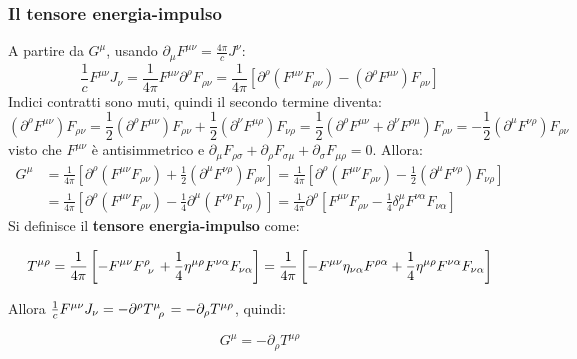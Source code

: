\documentclass[10pt, a4paper]{scrartcl}
\numberwithin{equation}{subsection}
\theoremstyle{style1}
\newenvironment{boxenv}[1][]{
    \begin{eqbox}[#1]
    }{
   \end{eqbox}
}
\begin{document}
\subsubsection{Il tensore energia-impulso}
A partire da $G^\mu $, usando $\partial _\mu F^{\mu \nu } =\frac{4\pi}{c}J^\nu $:
\[
\frac{1}{c}F^{\mu \nu } J_\nu = \frac{1}{4\pi} F^{\mu \nu } \partial ^\rho F_{\rho \nu } = \frac{1}{4\pi} \left[ \partial ^\rho (F^{\mu \nu } F_{\rho \nu }) - (\partial ^\rho F^{\mu \nu }) F_{\rho \nu }    \right] 
\] 
Indici contratti sono muti, quindi il secondo termine diventa:
\[
	(\partial ^\rho F^{\mu \nu } ) F_{\rho \nu } = \frac{1}{2}(\partial ^\rho F^{\mu \nu } ) F_{\rho  \nu } + \frac{1}{2}(\partial ^\nu F^{\mu \rho } ) F_{\nu \rho } = \frac{1}{2}(\partial ^\rho  F^{\mu \nu } + \partial ^\nu F^{\rho \mu } )F_{\rho \nu } =-\frac{1}{2} (\partial ^\mu F^{\nu \rho } )F_{\rho \nu } 
\] 
visto che $F^{\mu \nu } $ \`e antisimmetrico e $\partial _\mu  F_{\rho \sigma } + \partial _\rho F_{\sigma \mu } + \partial _\sigma F_{\mu \rho } =0$. Allora:
\begin{equation}
	\begin{split}
		G^{\mu }& = \frac{1}{4\pi} \left[ \partial ^\rho (F^{\mu \nu } F_{\rho \nu }) +\frac{1}{2} (\partial ^\mu F^{\nu \rho } ) F_{\rho \nu }  \right] = \frac{1}{4\pi} \left[ \partial ^\rho (F^{\mu \nu } F_{\rho \nu } ) - \frac{1}{2} (\partial ^\mu F^{\nu \rho } ) F_{\nu \rho }   \right] \\
			&= \frac{1}{4\pi }\left[ \partial ^\rho (F^{\mu \nu } F_{\rho \nu } ) - \frac{1}{4} \partial ^\mu (F^{\nu \rho } F_{\nu \rho } )  \right] = \frac{1}{4\pi} \partial ^\rho \left[ F^{\mu \nu } F_{\rho \nu } -\frac{1}{4} \delta ^{\mu } _\rho F^{\nu \alpha } F_{\nu \alpha }  \right] 
	\end{split}
\end{equation}
Si definisce il \textbf{tensore energia-impulso} come:
\begin{boxenv}[]
\begin{equation}
	T^{\mu \rho } = \frac{1}{4\pi} \left[ - F^{\mu \nu } F\indices{^\rho _\nu} + \frac{1}{4} \eta^{\mu \rho } F^{\nu \alpha } F_{\nu \alpha }  \right] = \frac{1}{4\pi}\left[ -F^{\mu \nu } \eta_{\nu \alpha } F^{\rho \alpha } +\frac{1}{4}\eta^{\mu \rho } F^{\nu \alpha } F_{\nu \alpha }     \right] 
\end{equation}
\end{boxenv}
\noindent Allora $\frac{1}{c}F^{\mu \nu } J_\nu  = - \partial ^\rho T\indices{^{\mu }_{\rho }} = - \partial _\rho  T^{\mu \rho } $, quindi:
\begin{boxenv}[]
\begin{equation}
	G^\mu = - \partial _\rho  T^{\mu \rho } 
\end{equation}
\end{boxenv}
\end{document}
